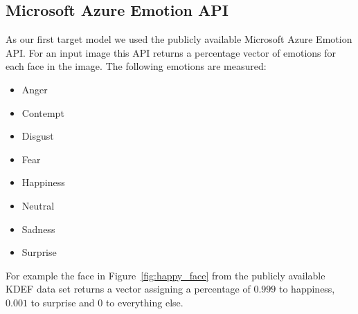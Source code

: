 \documentclass[a4paper,11pt]{article}
\begin{document}
    \subsection{Microsoft Azure Emotion API}
        As our first target model we used the publicly available Microsoft Azure Emotion API. For an input image this API returns a percentage vector of emotions for each face in the image. The following emotions are measured: 
            \begin{itemize}
                \item Anger
                \item Contempt
                \item Disgust
                \item Fear
                \item Happiness
                \item Neutral
                \item Sadness
                \item Surprise
            \end{itemize}
        For example the face in Figure~\ref{fig:happy_face} from the publicly available KDEF data set returns a vector assigning a percentage of $0.999$ to happiness, $0.001$ to surprise and $0$ to everything else.
\end{document}
